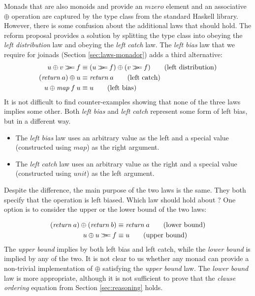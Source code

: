 \documentclass{sigplanconf}
\newcommand{\Varid}[1]{\mathit{#1}}
\newcommand{\bind}{\mathbin{>\!\!\!>\mkern-6.7mu=}}
\begin{document}
Monads that are also monoids and provide an \ensuremath{\Varid{mzero}} element and an associative \ensuremath{\oplus}
operation are captured by the  type class from the standard Haskell library. 
However, there is some confusion about the additional laws that should hold. The  
reform proposal \cite{monadplusreform} provides a solution by splitting the type class into  
obeying the \textit{left distribution} law and  obeying the \textit{left catch} law. The
\textit{left bias} law that we require for joinads (Section \ref{sec:laws-monador}) adds a third
alternative:
\begin{align*}
  u \mplus v \bind f &\equiv (u \bind f) \mplus (v \bind f) \tag{left distribution}\\
  (\Varid{return} \: a) \mplus u &\equiv \Varid{return} \: a \tag{left catch} \\
  u \morelse \map \: f \: u &\equiv u \tag{left bias}
\end{align*}
It is not difficult to find counter-examples showing that none of the three laws implies some other.
Both \textit{left bias} and \textit{left catch} represent some form of left bias, but in a 
different way. 

\begin{itemize}
\item The \textit{left bias} law uses an arbitrary value as the left
  and a special value (constructed using \ensuremath{\Varid{map}}) as the right argument. 

\item The \textit{left catch} law uses an arbitrary value as the right 
  and a special value (constructed using \ensuremath{\Varid{unit}}) as the left argument. 
\end{itemize}
Despite the difference, the main purpose of the two laws is the same. They both specify that the 
operation is left biased. Which law should hold about ? One option is to consider 
the upper or the lower bound of the two laws:

\begin{align*}
  (\Varid{return} \: a) \mplus (\Varid{return} \: b) &\equiv \Varid{return} \: a \tag{lower bound} \\
  u \morelse u \bind f &\equiv u \tag{upper bound}
\end{align*}
The \textit{upper bound} implies by both left bias and left catch, while the \textit{lower
bound} is implied by any of the two. It is not clear to us whether any monad can provide a 
non-trivial implementation of \ensuremath{\oplus} satisfying the \textit{upper bound} law. 
The \textit{lower bound} law is more appropriate, although it is not sufficient to prove that the 
\textit{clause ordering} equation from Section \ref{sec:reasoning} holds.
\end{document}
